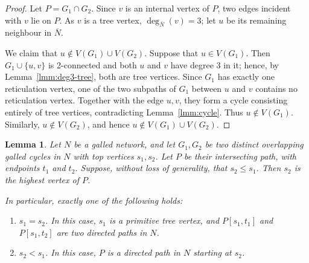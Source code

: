\documentclass[pdflatex,sn-mathphys-num]{sn-jnl}
\theoremstyle{thmstyleone}%
\theoremstyle{thmstyletwo}%
\newtheorem{lemma}{Lemma}
\theoremstyle{thmstylethree}%
\begin{document}
\begin{proof}
Let $P=G_1\cap G_2$. Since $v$ is an internal vertex of $P$, two edges incident with $v$ lie on $P$. As $v$ is a tree vertex, $\deg_{\overline N}(v)=3$; let $u$ be its remaining neighbour in $\overline N$.

We claim that $u\notin V(G_1)\cup V(G_2)$. Suppose that $u\in V(G_1)$. Then $G_1 \cup \{u,v\}$ is 2-connected and both $u$ and $v$ have degree $3$ in it; hence, by Lemma~\ref{lmm:deg3-tree}, both are tree vertices. Since $G_1$ has exactly one reticulation vertex, one of the two subpaths of $G_1$ between $u$ and $v$ contains no reticulation vertex. Together with the edge ${u,v}$, they form a cycle consisting entirely of tree vertices, contradicting Lemma~\ref{lmm:cycle}. Thus $u\notin V(G_1)$. Similarly, $u\notin V(G_2)$, and hence $u\notin V(G_1)\cup V(G_2)$.
\end{proof}


\begin{lemma} \label{lmm:twotoploca}
Let $N$ be a galled network, and let $G_1,G_2$ be two distinct overlapping galled cycles in $N$ with top vertices $s_1,s_2$. Let $P$ be their intersecting path, with endpoints $t_1$ and $t_2$. Suppose, without loss of generality, that $s_2\leq s_1$. Then $s_2$ is the highest vertex of $P$.

In particular, exactly one of the following holds:
\begin{enumerate}
\item[(i)] $s_1=s_2$. In this case, $s_1$ is a primitive tree vertex, and $P[s_1,t_1]$ and $P[s_1,t_2]$ are two directed paths in $N$.
\item[(ii)] $s_2<s_1$. In this case, $P$ is a directed path in $N$ starting at $s_2$.
\end{enumerate}
\end{lemma}
\end{document}
